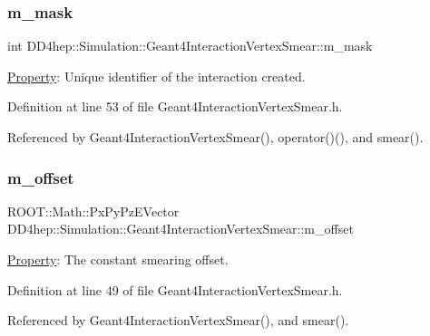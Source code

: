\subsubsection{\texorpdfstring{m\+\_\+mask}{m\_mask}}
{\footnotesize\ttfamily int D\+D4hep\+::\+Simulation\+::\+Geant4\+Interaction\+Vertex\+Smear\+::m\+\_\+mask\hspace{0.3cm}{\ttfamily [protected]}}



\hyperlink{class_d_d4hep_1_1_property}{Property}\+: Unique identifier of the interaction created. 



Definition at line 53 of file Geant4\+Interaction\+Vertex\+Smear.\+h.



Referenced by Geant4\+Interaction\+Vertex\+Smear(), operator()(), and smear().

\hypertarget{class_d_d4hep_1_1_simulation_1_1_geant4_interaction_vertex_smear_a34e2bcca2e7e15bad2fae703422fa22c}{}\label{class_d_d4hep_1_1_simulation_1_1_geant4_interaction_vertex_smear_a34e2bcca2e7e15bad2fae703422fa22c} 
\subsubsection{\texorpdfstring{m\+\_\+offset}{m\_offset}}
{\footnotesize\ttfamily R\+O\+O\+T\+::\+Math\+::\+Px\+Py\+Pz\+E\+Vector D\+D4hep\+::\+Simulation\+::\+Geant4\+Interaction\+Vertex\+Smear\+::m\+\_\+offset\hspace{0.3cm}{\ttfamily [protected]}}



\hyperlink{class_d_d4hep_1_1_property}{Property}\+: The constant smearing offset. 



Definition at line 49 of file Geant4\+Interaction\+Vertex\+Smear.\+h.



Referenced by Geant4\+Interaction\+Vertex\+Smear(), and smear().

\hypertarget{class_d_d4hep_1_1_simulation_1_1_geant4_interaction_vertex_smear_a407c72b211c3733623129565bcc71e0c}{}\label{class_d_d4hep_1_1_simulation_1_1_geant4_interaction_vertex_smear_a407c72b211c3733623129565bcc71e0c} 
